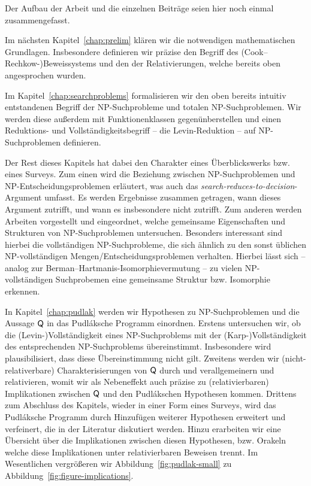 Der Aufbau der Arbeit und die einzelnen Beiträge seien hier noch einmal zusammengefasst.

Im nächsten Kapitel~\ref{chap:prelim} klären wir die notwendigen mathematischen Grundlagen. Insbesondere definieren wir präzise den Begriff des (Cook--Rechkow-)Beweissystems und den der Relativierungen, welche bereits oben angesprochen wurden.

Im Kapitel~\ref{chap:searchproblems} formalisieren wir den oben bereits intuitiv entstandenen Begriff der NP-Suchprobleme und totalen NP-Suchproblemen. 
Wir werden diese außerdem mit Funktionenklassen gegenünberstellen und einen Reduktions- und Vollständigkeitsbegriff -- die Levin-Reduktion -- auf NP-Suchproblemen definieren.

Der Rest dieses Kapitels hat dabei den Charakter eines Überblickswerks bzw. eines Surveys. 
Zum einen wird die Beziehung zwischen NP-Suchproblemen und NP-Entscheidungsproblemen erläutert, was auch das \emph{search-reduces-to-decision}-Argument umfasst. Es werden Ergebnisse zusammen getragen, wann dieses Argument zutrifft, und wann es insbesondere nicht zutrifft.
Zum anderen werden Arbeiten vorgestellt und eingeordnet, welche gemeinsame Eigenschaften und Strukturen von NP-Suchproblemen untersuchen. Besonders interessant sind hierbei die vollständigen NP-Suchprobleme, die sich ähnlich zu den sonst üblichen NP-vollständigen Mengen/Entscheidungsproblemen verhalten. Hierbei lässt sich -- analog zur Berman--Hartmanis-Isomorphievermutung -- zu vielen NP-vollständigen Suchprobemen eine gemeinsame Struktur bzw. Isomorphie erkennen.

In Kapitel~\ref{chap:pudlak} werden wir Hypothesen zu NP-Suchproblemen und die Aussage $\mathsf{Q}$ in das Pudláksche Programm einordnen. Erstens untersuchen wir, ob die (Levin-)Vollständigkeit eines NP-Suchproblems  mit der (Karp-)Vollständigkeit des entsprechenden NP-Suchproblems übereinstimmt. Insbesondere wird plausibilisiert, dass diese Übereinstimmung nicht gilt.
Zweitens werden wir (nicht-relativerbare) Charakterisierungen von $\mathsf{Q}$ durch \textcite{fenner_inverting_2003} und \textcite{messner_simulation_2001} verallgemeinern und relativieren, womit wir als Nebeneffekt auch präzise zu (relativierbaren) Implikationen zwischen $\mathsf{Q}$ und den Pudlákschen Hypothesen kommen.
Drittens zum Abschluss des Kapitels, wieder in einer Form eines Surveys, wird das Pudláksche Programm durch Hinzufügen weiterer Hypothesen erweitert und verfeinert, die in der Literatur diskutiert werden. Hinzu erarbeiten wir eine Übersicht über die Implikationen zwischen diesen Hypothesen, bzw. Orakeln welche diese Implikationen unter relativierbaren Beweisen trennt. Im Wesentlichen vergrößeren wir Abbildung~\ref{fig:pudlak-small} zu Abbildung~\ref{fig:figure-implications}.

